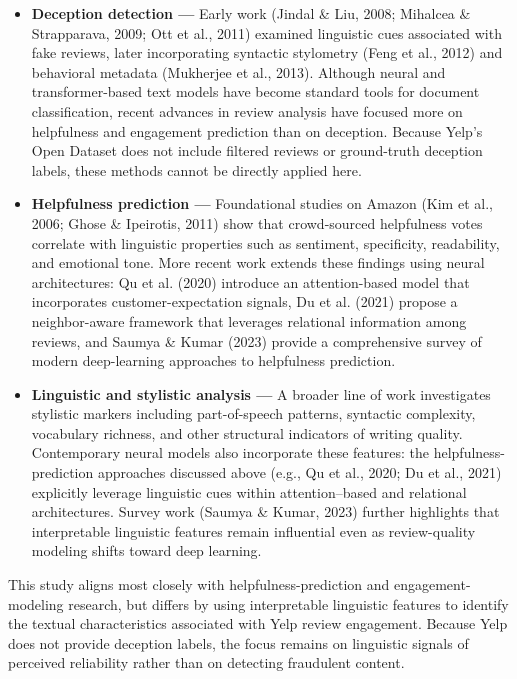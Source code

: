 \documentclass[12pt]{article}
\begin{document}
\begin{itemize}

\item \textbf{Deception detection —}  
Early work (Jindal \& Liu, 2008; Mihalcea \& Strapparava, 2009; Ott et al., 2011) examined linguistic cues associated with fake reviews, later incorporating syntactic stylometry (Feng et al., 2012) and behavioral metadata (Mukherjee et al., 2013). Although neural and transformer-based text models have become standard tools for document classification, recent advances in review analysis have focused more on helpfulness and engagement prediction than on deception. Because Yelp's Open Dataset does not include filtered reviews or ground-truth deception labels, these methods cannot be directly applied here.

\item \textbf{Helpfulness prediction —}  
Foundational studies on Amazon (Kim et al., 2006; Ghose \& Ipeirotis, 2011) show that crowd-sourced helpfulness votes correlate with linguistic properties such as sentiment, specificity, readability, and emotional tone. More recent work extends these findings using neural architectures: Qu et al. (2020) introduce an attention-based model that incorporates customer-expectation signals, Du et al. (2021) propose a neighbor-aware framework that leverages relational information among reviews, and Saumya \& Kumar (2023) provide a comprehensive survey of modern deep-learning approaches to helpfulness prediction.

\item \textbf{Linguistic and stylistic analysis —}  
A broader line of work investigates stylistic markers including part-of-speech patterns, syntactic complexity, vocabulary richness, and other structural indicators of writing quality. Contemporary neural models also incorporate these features: the helpfulness-prediction approaches discussed above (e.g., Qu et al., 2020; Du et al., 2021) explicitly leverage linguistic cues within attention--based and relational architectures. Survey work (Saumya \& Kumar, 2023) further highlights that interpretable linguistic features remain influential even as review-quality modeling shifts toward deep learning.
 
\end{itemize}

This study aligns most closely with helpfulness-prediction and engagement-modeling research, but differs by using interpretable linguistic features to identify the textual characteristics associated with Yelp review engagement. Because Yelp does not provide deception labels, the focus remains on linguistic signals of perceived reliability rather than on detecting fraudulent content.
\end{document}
